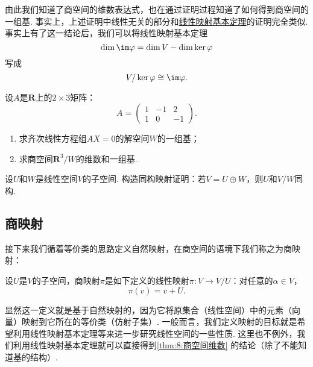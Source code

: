 由此我们知道了商空间的维数表达式，也在通过证明过程知道了如何得到商空间的一组基. 事实上，上述证明中线性无关的部分和\hyperref[thm:6:线性映射基本定理]{线性映射基本定理}的证明完全类似. 事实上有了这一结论后，我们可以将线性映射基本定理
\[\dim\im\varphi=\dim V-\dim\ker\varphi\]
写成
\[V/\ker\varphi\cong\im\varphi.\]

\begin{example}
    设$A$是$\mathbf{R}$上的$2\times 3$矩阵：
    \[A=\begin{pmatrix}
            1 & -1 & 2 \\ 1 & 0 & -1
        \end{pmatrix}.\]
    \begin{enumerate}
        \item 求齐次线性方程组$AX=0$的解空间$W$的一组基；

        \item 求商空间$\mathbf{R}^3/W$的维数和一组基.
    \end{enumerate}
\end{example}

\begin{solution}

\end{solution}

\begin{example}
    设$U$和$W$是线性空间$V$的子空间. 构造同构映射证明：若$V=U\oplus W$，则$U$和$V/W$同构.
\end{example}

\begin{solution}

\end{solution}

\subsection{商映射}

接下来我们循着等价类的思路定义自然映射，在商空间的语境下我们称之为商映射：
\begin{definition}
    设$U$是$V$的子空间，商映射$\pi$是如下定义的线性映射$\pi:V\to V/U$：对任意的$\alpha\in V$，
    \[\pi(v)=v+U.\]
\end{definition}
显然这一定义就是基于自然映射的，因为它将原集合（线性空间）中的元素（向量）映射到它所在的等价类（仿射子集）. 一般而言，我们定义映射的目标就是希望利用线性映射基本定理等来进一步研究线性空间的一些性质. 这里也不例外，我们利用线性映射基本定理就可以直接得到\autoref{thm:8:商空间维数} 的结论（除了不能知道基的结构）.

